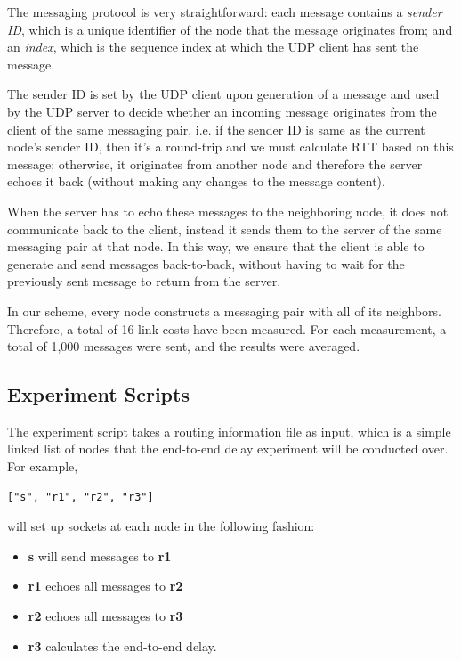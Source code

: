 \documentclass[conference]{IEEEtran}
\begin{document}
The messaging protocol is very straightforward: each message contains a \textit{sender ID}, which is
a unique identifier of the node that the message originates from; and an \textit{index}, which is the
sequence index at which the UDP client has sent the message.

The sender ID is set by the UDP client upon generation of a message and used by the UDP server
to decide whether an incoming message originates from the client of the same messaging pair,
i.e. if the sender ID is same as the current node's sender ID, then it's a round-trip and we must
calculate RTT based on this message; otherwise, it originates from another node and therefore the server echoes it back
(without making any changes to the message content).

When the server has to echo these messages to the neighboring node, it does not communicate back to the client, instead it
sends them to the server of the same messaging pair at that node. In this way, we ensure that the client is able to generate and
send messages back-to-back, without having to wait for the previously sent message to return from the server.

In our scheme, every node constructs a messaging pair with all of its neighbors. Therefore, a total
of 16 link costs have been measured. For each measurement, a total of 1,000 messages were sent,
and the results were averaged.

\subsection{Experiment Scripts}
The experiment script takes a routing information file as input, which is a simple linked list of
nodes that the end-to-end delay experiment will be conducted over. For example,

\begin{lstlisting}
["s", "r1", "r2", "r3"]
\end{lstlisting}

will set up sockets at each node in the following fashion:

\begin{itemize}
    \item \textbf{s} will send messages to \textbf{r1}
    \item \textbf{r1} echoes all messages to \textbf{r2}
    \item \textbf{r2} echoes all messages to \textbf{r3}
    \item \textbf{r3} calculates the end-to-end delay.
\end{itemize}
\end{document}
